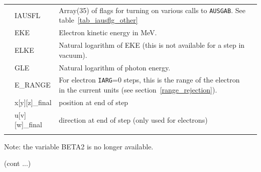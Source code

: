 \begin{table}[htb]
\begin{center}
\begin{tabular}{ l  l   p{105mm}l  |}
           & IAUSFL & Array(35) of flags for turning on
                   various calls to {\tt AUSGAB}. See table~\ref{tab_iausflg_other}\\
           & EKE   & Electron kinetic energy in MeV.\\
           & ELKE  & Natural logarithm of EKE (this is not available for
                     a step in vacuum).\\
           & GLE   & Natural logarithm of photon energy.\\
           & E\_RANGE & For electron {\tt IARG}=0  steps, this is the range of the
electron in the current units (see section~\ref{range_rejection}).\\
           & x[y][z]\_final & position at end of step \\
           & u[v][w]\_final & direction at end of step (only used for electrons)\\
&&\\
\hline
    \end{tabular}
    Note: the variable BETA2 is no longer available.\\
    \end{center}
    \mbox{}\hfill (cont ...)\\
    \end{table}

\clearpage

